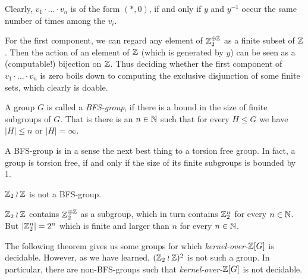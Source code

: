 	Clearly, $v_1 \cdot ... \cdot v_n$ is of the form $(*,0)$, if and only if $y$ and $y^{-1}$ occur the same number of times among the $v_i$.\footnotemark

	For the first component, we can regard any element of $\mathbb{Z}_2^{\oplus \mathbb{Z}}$ as a finite subset of $\mathbb{Z}$.
	Then the action of an element of $\mathbb{Z}$ (which is generated by $y$) can be seen as a (computable!) bijection on $\mathbb{Z}$.
	Thus deciding whether the first component of $v_1 \cdot ... \cdot v_n$ is zero boils down to computing the exclusive disjunction of some finite sets, which clearly is doable.
\endproof

\begin{Definition}
	A group $G$ is called a \emph{BFS-group}, if there is a bound in the size of finite subgroups of $G$.
	That is there is an $n \in \mathbb{N}$ such that for every $H \leq G$ we have $|H| \leq n$ or $|H| = \infty$.
\end{Definition}

\begin{Remark}
	A BFS-group is in a sense the next best thing to a torsion free group.
	In fact, a group is torsion free, if and only if the size of its finite subgroups is bounded by 1.
\end{Remark}

\begin{Example}
	$\mathbb{Z}_2 \wr \mathbb{Z}$ is not a BFS-group.
\end{Example}
\proof
	$\mathbb{Z}_2 \wr \mathbb{Z}$ contains $\mathbb{Z}_2^{\oplus \mathbb{Z}}$ as a subgroup, which in turn contains $\mathbb{Z}_2^n$ for every $n \in \mathbb{N}$. But $|\mathbb{Z}_2^n| = 2^n$ which is finite and larger than $n$ for every $n \in \mathbb{N}$.
\endproof

The following theorem gives us some groups for which \emph{kernel-over-$\mathbb{Z}[G]$} is decidable.
However, as we have learned, $(\mathbb{Z}_2 \wr \mathbb{Z})^2$ is not such a group.
In particular, there are non-BFS-groups such that \emph{kernel-over-$\mathbb{Z}[G]$} is not decidable.

